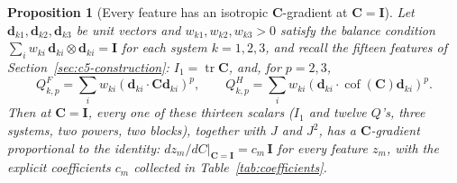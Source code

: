 \documentclass[10pt,a4paper]{article}
\newtheorem{proposition}{Proposition}
\newcommand{\Cof}{\operatorname{cof}}
\newcommand{\tr}{\operatorname{tr}}
\begin{document}
\begin{proposition}[Every feature has an isotropic $\bm C$-gradient at $\bm C=\bm I$]
\label{prop:isotropic-features}
Let $\bm d_{k1},\bm d_{k2},\bm d_{k3}$ be unit vectors and $w_{k1},w_{k2},w_{k3}>0$
satisfy the balance condition $\sum_iw_{ki}\,\bm d_{ki}\otimes \bm d_{ki}=\bm I$ for
each system $k=1,2,3$, and recall the fifteen features of
Section~\ref{sec:c5-construction}: $I_1=\tr \bm C$, and, for $p=2,3$,
\begin{equation}
 Q_{k,p}^F=\sum_iw_{ki}(\bm d_{ki}\cdot \bm C\bm d_{ki})^p,\qquad
 Q_{k,p}^H=\sum_iw_{ki}(\bm d_{ki}\cdot\Cof(\bm C)\bm d_{ki})^p .
\end{equation}
Then at $\bm C=\bm I$, every one of these thirteen scalars ($I_1$ and twelve
$Q$'s, three systems, two powers, two blocks), together with $J$ and
$J^2$, has a $\bm C$-gradient proportional to the identity: $dz_m/dC|_{\bm C=\bm I}
=c_m\,\bm I$ for every feature $z_m$, with the explicit coefficients $c_m$
collected in Table~\ref{tab:coefficients}.
\end{proposition}
\end{document}
